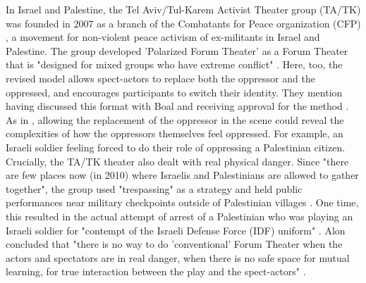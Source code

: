 \documentclass[dissertation,math,vertlayout,pdfa,colorlinks]{aaltoseries}
\begin{document}
In Israel and Palestine, the Tel Aviv/Tul-Karem Activist Theater group (TA/TK) was founded in 2007 as a branch of the Combatants for Peace organization (CFP) \cite{alonCHAPTERFOURTEENNonViolent2011}, a movement for non-violent peace activism of ex-militants in Israel and Palestine. The group developed 'Polarized Forum Theater' as a Forum Theater that is "designed for mixed groups who have extreme conflict" \cite[p. 167]{alonCHAPTERFOURTEENNonViolent2011}. Here, too, the revised model allows spect-actors to replace both the oppressor and the oppressed, and encourages participants to switch their identity. They mention having discussed this format with Boal and receiving approval for the method \cite[p. 167]{alonCHAPTERFOURTEENNonViolent2011}. As in \cite{miramontiForumTheatreReconciliation2025}, allowing the replacement of the oppressor in the scene could reveal the complexities of how the oppressors themselves feel oppressed. For example, an Israeli soldier feeling forced to do their role of oppressing a Palestinian citizen. Crucially, the TA/TK theater also dealt with real physical danger. Since "there are few places now (in 2010) where Israelis and Palestinians are allowed to gather together", the group used "trespassing" as a strategy and held public performances near military checkpoints outside of Palestinian villages \cite[p. 170]{alonCHAPTERFOURTEENNonViolent2011}. One time, this resulted in the actual attempt of arrest of a Palestinian who was playing an Israeli soldier for "contempt of the Israeli Defense Force (IDF) uniform" \cite[p. 171]{alonCHAPTERFOURTEENNonViolent2011}. Alon concluded that "there is no way to do 'conventional' Forum Theater when the actors and spectators are in real danger, when there is no safe space for mutual learning, for true interaction between the play and the spect-actors" \cite[p. 172]{alonCHAPTERFOURTEENNonViolent2011}.
\end{document}
